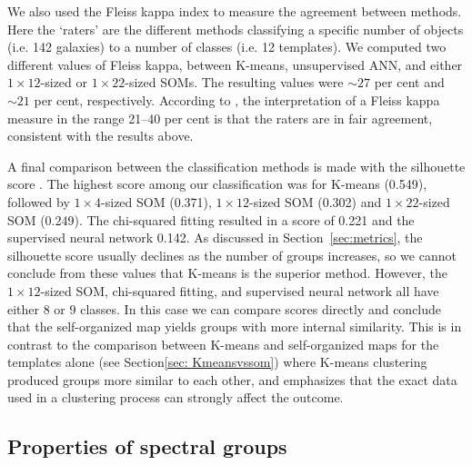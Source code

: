         
       We also used the Fleiss kappa index \citet{landis77} to 
        measure the agreement between methods. 
        Here the `raters' are the different methods classifying a specific number of objects (i.e. 142 galaxies) to a number of classes (i.e. 12 templates).
        We computed two different values of Fleiss kappa, between  K-means, unsupervised ANN, and either 
         $1\times12$-sized or $1\times22$-sized SOMs.
        The resulting values were $\sim 27$ per cent and $\sim 21$ per cent, respectively.
        According to \citet{landis77}, the interpretation of a Fleiss kappa measure in the range 21--40 per cent is that the raters are in fair agreement, consistent with the results above. 

A final comparison between the classification methods is 
made with the silhouette score  \citep{rousseeuw87}.
The highest score among our classification was for K-means (0.549), followed by $1\times4$-sized SOM (0.371), $1\times12$-sized SOM (0.302) and $1\times22$-sized SOM (0.249).
The chi-squared fitting resulted in a score of 0.221 and the supervised neural network 0.142.
As discussed in Section~\ref{sec:metrics}, the silhouette score usually declines as the number of groups increases, so we cannot conclude from these values that K-means is the superior method. 
However, the $1\times12$-sized SOM, chi-squared fitting, and supervised neural network all have either 8 or 9 classes.
In this case we can compare scores directly and conclude that the self-organized map yields groups with more internal similarity.
This is in contrast to the comparison between K-means and self-organized maps for the templates alone (see Section\ref{sec: Kmeansvssom}) where K-means clustering  produced groups more similar to each other, and emphasizes that the exact data used in a clustering process can strongly affect the outcome.


 \subsection{Properties of spectral groups}
       
